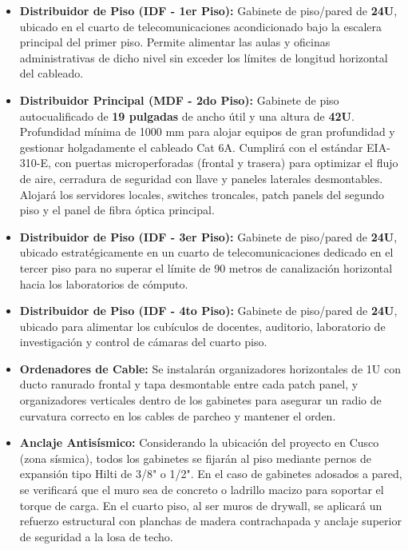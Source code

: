 \begin{itemize}
    \item \textbf{Distribuidor de Piso (IDF - 1er Piso):} Gabinete de piso/pared de \textbf{24U}, ubicado en el cuarto de telecomunicaciones acondicionado bajo la escalera principal del primer piso. Permite alimentar las aulas y oficinas administrativas de dicho nivel sin exceder los límites de longitud horizontal del cableado.
    \item \textbf{Distribuidor Principal (MDF - 2do Piso):} Gabinete de piso autocualificado de \textbf{19 pulgadas} de ancho útil y una altura de \textbf{42U}. Profundidad mínima de 1000 mm para alojar equipos de gran profundidad y gestionar holgadamente el cableado Cat 6A. Cumplirá con el estándar EIA-310-E, con puertas microperforadas (frontal y trasera) para optimizar el flujo de aire, cerradura de seguridad con llave y paneles laterales desmontables. Alojará los servidores locales, switches troncales, patch panels del segundo piso y el panel de fibra óptica principal.
    \item \textbf{Distribuidor de Piso (IDF - 3er Piso):} Gabinete de piso/pared de \textbf{24U}, ubicado estratégicamente en un cuarto de telecomunicaciones dedicado en el tercer piso para no superar el límite de 90 metros de canalización horizontal hacia los laboratorios de cómputo.
    \item \textbf{Distribuidor de Piso (IDF - 4to Piso):} Gabinete de piso/pared de \textbf{24U}, ubicado para alimentar los cubículos de docentes, auditorio, laboratorio de investigación y control de cámaras del cuarto piso.
    \item \textbf{Ordenadores de Cable:} Se instalarán organizadores horizontales de 1U con ducto ranurado frontal y tapa desmontable entre cada patch panel, y organizadores verticales dentro de los gabinetes para asegurar un radio de curvatura correcto en los cables de parcheo y mantener el orden.
    \item \textbf{Anclaje Antisísmico:} Considerando la ubicación del proyecto en Cusco (zona sísmica), todos los gabinetes se fijarán al piso mediante pernos de expansión tipo Hilti de 3/8" o 1/2". En el caso de gabinetes adosados a pared, se verificará que el muro sea de concreto o ladrillo macizo para soportar el torque de carga. En el cuarto piso, al ser muros de drywall, se aplicará un refuerzo estructural con planchas de madera contrachapada y anclaje superior de seguridad a la losa de techo.
\end{itemize}

